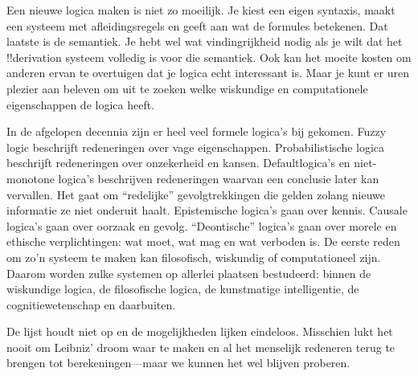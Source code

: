 \documentclass[../../../include/open-logic-section]{subfiles}
\begin{document}


Een nieuwe logica maken is niet zo moeilijk. Je kiest een eigen syntaxis, maakt
een systeem met afleidingsregels en geeft aan wat de formules betekenen. Dat
laatste is de semantiek. Je hebt wel wat vindingrijkheid nodig als je wilt dat
het !!{derivation} systeem volledig is voor die semantiek. Ook kan het moeite
kosten om anderen ervan te overtuigen dat je logica echt interessant is. Maar
je kunt er uren plezier aan beleven om uit te zoeken welke wiskundige en
computationele eigenschappen de logica heeft.

In de afgelopen decennia zijn er heel veel formele logica's bij gekomen. Fuzzy
logic beschrijft redeneringen over vage eigenschappen. Probabilistische logica
beschrijft redeneringen over onzekerheid en kansen. Defaultlogica's en
niet-monotone logica's beschrijven redeneringen waarvan een conclusie later kan
vervallen. Het gaat om ``redelijke'' gevolgtrekkingen die gelden zolang nieuwe
informatie ze niet onderuit haalt. Epistemische logica's gaan over kennis.
Causale logica's gaan over oorzaak en gevolg. ``Deontische'' logica's gaan over
morele en ethische verplichtingen: wat moet, wat mag en wat verboden is. De
eerste reden om zo'n systeem te maken kan filosofisch, wiskundig of
computationeel zijn. Daarom worden zulke systemen op allerlei plaatsen
bestudeerd: binnen de wiskundige logica, de filosofische logica, de kunstmatige
intelligentie, de cognitiewetenschap en daarbuiten.

De lijst houdt niet op en de mogelijkheden lijken eindeloos. Misschien lukt het
nooit om Leibniz' droom waar te maken en al het menselijk redeneren terug te
brengen tot berekeningen---maar we kunnen het wel blijven proberen.
\end{document}

